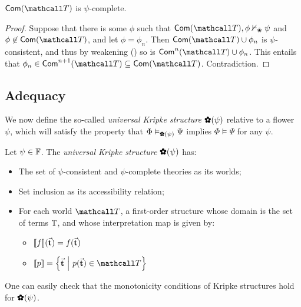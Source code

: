 \begin{lemma}
  $\completion{\tT}$ is $\psi$-complete.
\end{lemma}
\begin{proof}
  Suppose that there is some $\phi$ such that $\completion{\tT}, \phi
  \nvdash_\Nature \psi$ and $\phi \not\in \completion{\tT}$, and let $\phi =
  \phi_n$. Then $\completion{\tT} \cup \phi_n$ is $\psi$-consistent, and thus by
  weakening () so is $\ncompletion{\tT}{n} \cup \phi_n$. This
  entails that $\phi_n \in \ncompletion{\tT}{n+1} \subseteq \completion{\tT}$.
  Contradiction.
\end{proof}

\subsection{Adequacy}

We now define the so-called \emph{universal Kripke structure} $\rewolF{\psi}$
relative to a flower $\psi$, which will satisfy the property that $\Phi
\vDash_{\rewolF{\psi}} \Psi$ implies $\Phi \vDash \Psi$ for any $\psi$.

\begin{definition}
  Let $\psi \in \mathbb{F}$. The \emph{universal Kripke structure}
  $\rewolF{\psi}$ has:
  \begin{itemize}
    \item The set of $\psi$-consistent and $\psi$-complete theories as its worlds;
    \item Set inclusion as its accessibility relation;
    \item For each world $\tT$, a first-order structure whose domain is the set of
    terms $\mathbb{T}$, and whose interpretation map is given by:
      \begin{itemize}
        \item $\llbracket f \rrbracket(\vec{\mathbf{t}}) = f(\vec{\mathbf{t}})$
        \item $\interp{p} = \compr{\tvec{t}}{p(\tvec{t}) \in \tT}$
      \end{itemize}
  \end{itemize}
  One can easily check that the monotonicity conditions of Kripke structures
  hold for $\rewolF{\psi}$.
\end{definition}

